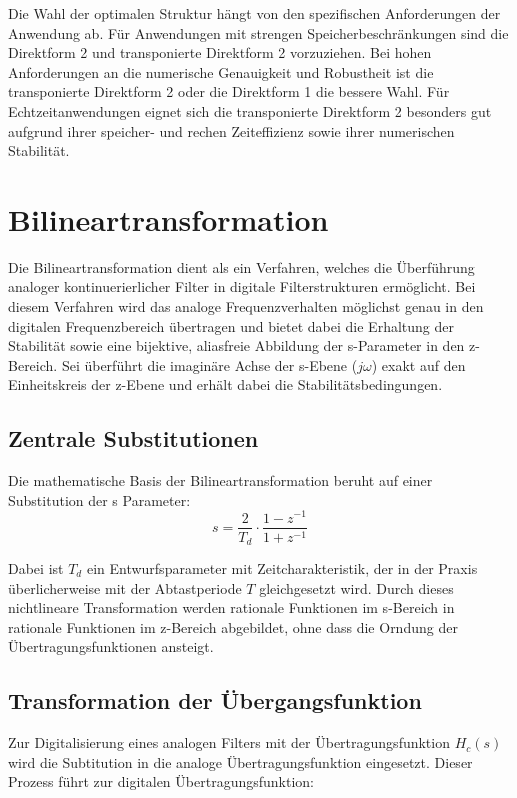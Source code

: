 \documentclass[
  ngerman,
  letterpaper,
  DIV=11]{scrreprt}
\begin{document}
Die Wahl der optimalen Struktur hängt von den spezifischen Anforderungen
der Anwendung ab. Für Anwendungen mit strengen Speicherbeschränkungen
sind die Direktform 2 und transponierte Direktform 2 vorzuziehen. Bei
hohen Anforderungen an die numerische Genauigkeit und Robustheit ist die
transponierte Direktform 2 oder die Direktform 1 die bessere Wahl. Für
Echtzeitanwendungen eignet sich die transponierte Direktform 2 besonders
gut aufgrund ihrer speicher- und rechen Zeiteffizienz sowie ihrer
numerischen Stabilität.

\chapter{Bilineartransformation}\label{bilineartransformation}

Die Bilineartransformation dient als ein Verfahren, welches die
Überführung analoger kontinuerierlicher Filter in digitale
Filterstrukturen ermöglicht. Bei diesem Verfahren wird das analoge
Frequenzverhalten möglichst genau in den digitalen Frequenzbereich
übertragen und bietet dabei die Erhaltung der Stabilität sowie eine
bijektive, aliasfreie Abbildung der s-Parameter in den z-Bereich. Sei
überführt die imaginäre Achse der s-Ebene (\(j\omega\)) exakt auf den
Einheitskreis der z-Ebene und erhält dabei die Stabilitätsbedingungen.

\section{Zentrale Substitutionen}\label{zentrale-substitutionen}

Die mathematische Basis der Bilineartransformation beruht auf einer
Substitution der s Parameter: \[
s = \frac{2}{T_d} \cdot \frac{1 - z^{-1}}{1 + z^{-1}}
\]

Dabei ist \(T_d\) ein Entwurfsparameter mit Zeitcharakteristik, der in
der Praxis überlicherweise mit der Abtastperiode \(T\) gleichgesetzt
wird. Durch dieses nichtlineare Transformation werden rationale
Funktionen im s-Bereich in rationale Funktionen im z-Bereich abgebildet,
ohne dass die Orndung der Übertragungsfunktionen ansteigt.

\section{Transformation der
Übergangsfunktion}\label{transformation-der-uxfcbergangsfunktion}

Zur Digitalisierung eines analogen Filters mit der Übertragungsfunktion
\(H_c(s)\) wird die Subtitution in die analoge Übertragungsfunktion
eingesetzt. Dieser Prozess führt zur digitalen Übertragungsfunktion:
\end{document}
